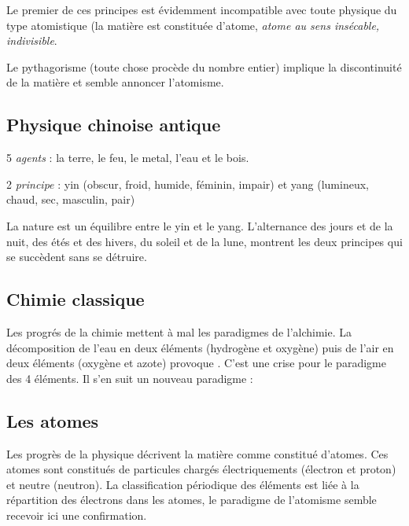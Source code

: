 Le premier de ces principes est évidemment incompatible avec toute physique du type atomistique (la matière est constituée d'atome, {\it atome au sens insécable, indivisible}.

Le pythagorisme (toute chose procède du nombre entier) implique la discontinuité de la matière et semble annoncer l'atomisme.

\subsection{Physique chinoise antique}

\begin{center}
5 {\it agents} : la terre, le feu, le metal, l'eau et le bois.

2 {\it principe} : yin (obscur, froid, humide, féminin, impair) et yang (lumineux, chaud, sec, masculin, pair)
\end{center}

La nature est un équilibre entre le yin et le yang. L'alternance des jours et de la nuit, des étés et des hivers, du soleil et de la lune, montrent les deux principes qui se succèdent sans se détruire.

\subsection{Chimie classique}

Les progrés de la chimie mettent à mal les paradigmes de l'alchimie.
La décomposition de l'eau en deux éléments (hydrogène et oxygène) puis de l'air en deux éléments (oxygène et azote) provoque . C'est une crise pour le paradigme des 4 éléments. Il s'en suit un nouveau paradigme :

\subsection{Les atomes}
\setlength{\fboxsep}{6pt}
Les progrès de la physique décrivent la matière comme constitué d'atomes. Ces atomes sont constitués de particules chargés électriquements (électron et proton) et neutre (neutron). La classification périodique des éléments est liée à la répartition des électrons dans les atomes, le paradigme de l'atomisme semble recevoir ici une confirmation.

